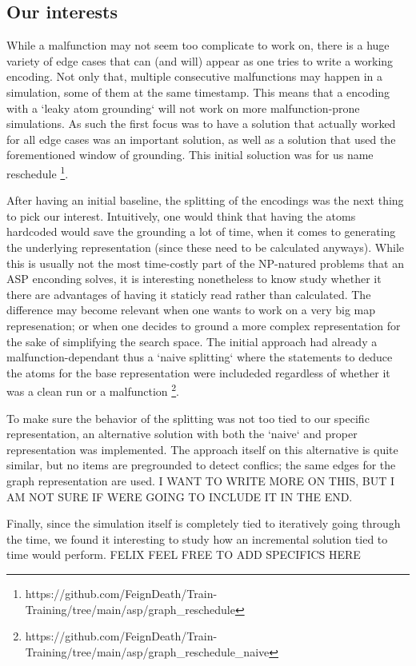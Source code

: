 \subsection{Our interests}

While a malfunction may not seem too complicate to work on, there is a huge variety of edge cases that can (and will) appear as one tries to write a working encoding. Not only that, multiple consecutive malfunctions may happen in a simulation, some of them at the same timestamp. This means that a encoding with a `leaky atom grounding` will not work on more malfunction-prone simulations. As such the first focus was to have a solution that actually worked for all edge cases was an important solution, as well as a solution that used the forementioned window of grounding. This initial soluction was for us name reschedule \footnote{https://github.com/FeignDeath/Train-Training/tree/main/asp/graph\_reschedule}. 


After having an initial baseline, the splitting of the encodings was the next thing to pick our interest. Intuitively, one would think that having the atoms hardcoded would save the grounding a lot of time, when it comes to generating the underlying representation (since these need to be calculated anyways). While this is usually not the most time-costly part of the NP-natured problems that an ASP enconding solves, it is interesting nonetheless to know study whether it there are advantages of having it staticly read rather than calculated. The difference may become relevant when one wants to work on a very big map represenation; or when one decides to ground a more complex representation for the sake of simplifying the search space.  The initial approach had already a malfunction-dependant thus a `naive splitting` where the statements to deduce the atoms for the base representation were includeded regardless of whether it was a clean run or a malfunction \footnote{https://github.com/FeignDeath/Train-Training/tree/main/asp/graph\_reschedule\_naive}. 

To make sure the behavior of the splitting was not too tied to our specific representation, an alternative solution with both the `naive` and proper representation was implemented. The approach itself on this alternative is quite similar, but no items are pregrounded to detect conflics; the same edges for the graph representation are used. 
\color{red}
I WANT TO WRITE MORE ON THIS, BUT I AM NOT SURE IF WERE GOING TO INCLUDE IT IN THE END.
\color{black}


Finally, since the simulation itself is completely tied to iteratively going through the time, we found it interesting to study how an incremental solution tied to time would perform. 
\color{red}FELIX FEEL FREE TO ADD SPECIFICS HERE
\color{black}

